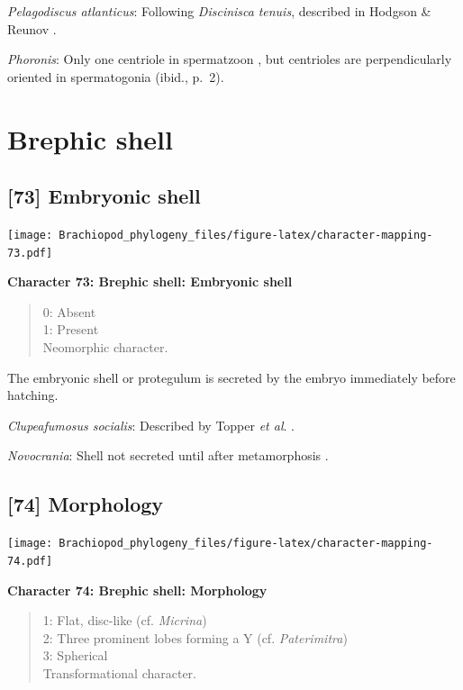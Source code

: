 \documentclass[openany]{book}
\theoremstyle{definition}
\theoremstyle{definition}
\theoremstyle{definition}
\theoremstyle{remark}
\begin{document}
\hypertarget{Pelagodiscus_atlanticus-coding-72}{}
\emph{Pelagodiscus atlanticus}: Following \emph{Discinisca}
\emph{tenuis}, described in Hodgson \& Reunov
\citeyearpar{Hodgson1994Ultrastructureof}.

\hypertarget{Phoronis-coding-72}{}
\emph{Phoronis}: Only one centriole in spermatzoon
\citep[p.~7]{Reunov2004Ultrastructuralstudy}, but centrioles are
perpendicularly oriented in spermatogonia (ibid., p.~2).

\section{Brephic shell}\label{brephic-shell}

\subsection*{{[}73{]} Embryonic shell}\label{embryonic-shell}

\texttt{[image: Brachiopod\_phylogeny\_files/figure-latex/character-mapping-73.pdf]}

\textbf{Character 73: Brephic shell: Embryonic shell}

\begin{quote}
0: Absent\\
1: Present\\
Neomorphic character.
\end{quote}

The embryonic shell or protegulum is secreted by the embryo immediately
before hatching.

\hypertarget{Clupeafumosus_socialis-coding-73}{}
\emph{Clupeafumosus socialis}: Described by Topper \emph{et al}.
\citeyearpar{Topper2013Reappraisalof}.

\hypertarget{Novocrania-coding-73}{}
\emph{Novocrania}: Shell not secreted until after metamorphosis
\citep{Popov2010Earliestontogeny}.

\subsection*{{[}74{]} Morphology}\label{morphology}

\texttt{[image: Brachiopod\_phylogeny\_files/figure-latex/character-mapping-74.pdf]}

\textbf{Character 74: Brephic shell: Morphology}

\begin{quote}
1: Flat, disc-like (cf. \emph{Micrina})\\
2: Three prominent lobes forming a Y (cf. \emph{Paterimitra})\\
3: Spherical\\
Transformational character.
\end{quote}
\end{document}
